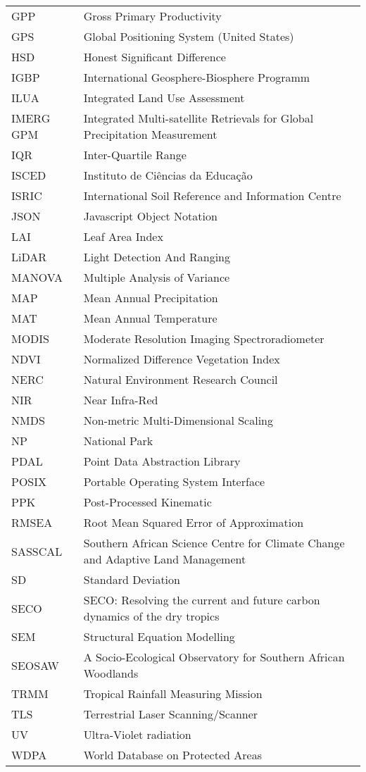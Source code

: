 \begin{longtable}{lp{11cm}}
	GPP & Gross Primary Productivity \\
	GPS & Global Positioning System (United States) \\
	HSD & Honest Significant Difference \\
	IGBP & International Geosphere-Biosphere Programm \\
	ILUA & Integrated Land Use Assessment \\
	IMERG GPM & Integrated Multi-satellite Retrievals for Global Precipitation Measurement \\
	IQR & Inter-Quartile Range \\
	ISCED & Instituto de Ci\^{e}ncias da Educa\c{c}\~{a}o  \\
	ISRIC & International Soil Reference and Information Centre \\
	JSON & Javascript Object Notation \\
	LAI & Leaf Area Index \\
	LiDAR & Light Detection And Ranging \\
	MANOVA & Multiple Analysis of Variance \\
	MAP & Mean Annual Precipitation \\
	MAT & Mean Annual Temperature \\
	MODIS & Moderate Resolution Imaging Spectroradiometer \\
	NDVI & Normalized Difference Vegetation Index \\
	NERC & Natural Environment Research Council \\
	NIR & Near Infra-Red \\
	NMDS & Non-metric Multi-Dimensional Scaling \\
	NP & National Park \\
	PDAL & Point Data Abstraction Library \\
	POSIX & Portable Operating System Interface \\
	PPK & Post-Processed Kinematic \\
	RMSEA & Root Mean Squared Error of Approximation \\
	SASSCAL & Southern African Science Centre for Climate Change and Adaptive Land Management \\
	SD & Standard Deviation \\
	SECO & SECO: Resolving the current and future carbon dynamics of the dry tropics \\ 
	SEM & Structural Equation Modelling \\
	SEOSAW & A Socio-Ecological Observatory for Southern African Woodlands \\
	TRMM & Tropical Rainfall Measuring Mission \\
	TLS & Terrestrial Laser Scanning/Scanner \\
	UV & Ultra-Violet radiation \\
	WDPA & World Database on Protected Areas \\
\end{longtable}
